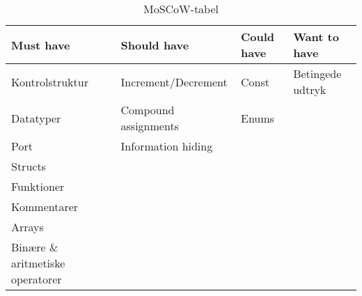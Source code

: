 %
%
\begin{table}[H]
\centering
\begin{tabular}{l|l|l|l}
\toprule
\textbf{Must have} & \textbf{Should have} & \textbf{Could have} & \textbf{Want to have} \\ \midrule
Kontrolstruktur & Increment/Decrement & Const & Betingede udtryk   \\ 
Datatyper & Compound assignments & Enums & \\ 
Port & Information hiding & &	   \\ 
Structs	&  &  &		   \\ 
Funktioner &  &  & 		   \\ 
Kommentarer &  &  & 		   \\ 
Arrays &  &  & 	   \\ 
Binære \& aritmetiske operatorer &  &  & 		   \\ \bottomrule
 

 

\end{tabular}
\caption{MoSCoW-tabel}
\label{tab:moscow}
\end{table}

